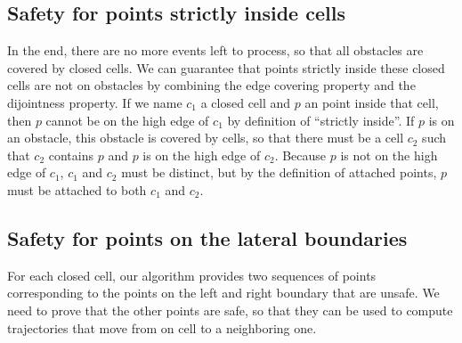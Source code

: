 \documentclass[a4paper, USenglish, cleveref, autoref, thm-restate]{lipics-v2021}
\begin{document}
\subsection{Safety for points strictly inside cells}
In the end, there are no more events left to process, so that all
obstacles are covered by closed cells.  
We can guarantee that points strictly inside these closed cells are not
on obstacles by combining the edge covering property and the
dijointness property.  If we name \(c_1\) a closed cell and \(p\) an
point inside that cell, then \(p\) cannot be on the high edge of
\(c_1\) by definition of ``strictly inside''.  If \(p\) is on an
obstacle, this obstacle is covered by cells, so that there must be a
cell \(c_2\) such that \(c_2\) contains \(p\) and \(p\) is on the high
edge of \(c_2\).  Because \(p\) is not on the high edge of \(c_1\),
\(c_1\) and \(c_2\) must be distinct, but by the definition of
attached points, \(p\) must be attached to both \(c_1\) and \(c_2\).
\subsection{Safety for points on the lateral boundaries}
For each closed cell, our algorithm provides two sequences of points
corresponding to the points on the left and right boundary that are
unsafe.  We need to prove that the other points are safe, so that they
can be used to compute trajectories that move from on cell to a
neighboring one.
\end{document}
